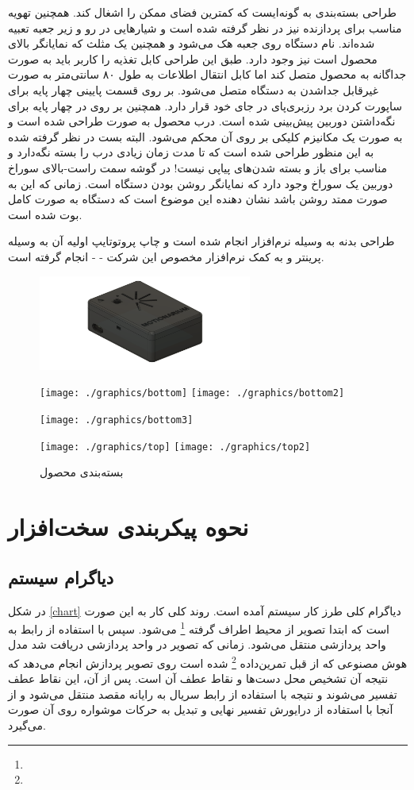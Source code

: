 \documentclass{article}
\begin{document}
طراحی بسته‌بندی به گونه‌ایست که کمترین‌ فضای ممکن را اشغال کند. همچنین تهویه مناسب برای پردازنده
نیز در نظر گرفته شده است و شیار‌هایی در رو و زیر جعبه تعبیه شده‌اند. 
نام دستگاه روی جعبه هک می‌شود و همچنین یک مثلث که نمایانگر بالای محصول است نیز وجود دارد. 
طبق این طراحی کابل تغذیه را کاربر باید به صورت جداگانه به محصول متصل کند اما کابل
انتقال اطلاعات به طول ۸۰ سانتی‌متر به صورت غیرقابل جدا‌شدن به دستگاه متصل می‌شود.
بر روی قسمت پایینی چهار پایه برای ساپورت‌ کردن برد رزبری‌پای در جای خود قرار دارد. همچنین
بر روی در چهار پایه برای نگه‌داشتن دوربین پیش‌بینی شده است.
درب محصول به صورت  طراحی شده است و به صورت یک مکانیزم کلیکی بر روی آن محکم می‌شود.
البته بست در نظر گرفته شده به این منظور طراحی شده است که تا مدت زمان زیادی درب را بسته نگه‌دارد
و مناسب برای باز و بسته شدن‌های پیاپی نیست! در گوشه سمت راست-بالای سوراخ دوربین یک سوراخ وجود دارد
که نمایانگر روشن بودن دستگاه است. زمانی که این  به صورت ممتد روشن باشد
نشان دهنده این موضوع است که دستگاه به صورت کامل بوت شده است.


طراحی بدنه به وسیله نرم‌افزار  انجام شده است و چاپ پروتوتایپ اولیه آن به وسیله پرینتر  و به کمک نرم‌افزار مخصوص این شرکت -  - انجام گرفته است.

\begin{figure}
	\centering
	
	\includegraphics[width=7cm]{./graphics/main}
	
	\texttt{[image: ./graphics/bottom]}
	\texttt{[image: ./graphics/bottom2]}
	
	\texttt{[image: ./graphics/bottom3]}
	
	\texttt{[image: ./graphics/top]}
	\texttt{[image: ./graphics/top2]}
	
	\caption{بسته‌بندی محصول}
	\label{case}
\end{figure}

\section{نحوه پیکر‌بندی سخت‌افزار}
\subsection{دیاگرام سیستم}
در شکل \ref{chart} دیاگرام کلی طرز کار سیستم‌ آمده است. روند کلی کار به این صورت است که
ابتدا تصویر از محیط اطراف گرفته \footnote{} می‌شود. سپس با استفاده از رابط  به واحد پردازشی منتقل می‌شود. زمانی که تصویر در واحد پردازشی دریافت شد مدل هوش
مصنوعی که از قبل تمرین‌داده \footnote{} شده است روی تصویر پردازش انجام می‌دهد که
نتیجه آن تشخیص محل دست‌ها و نقاط عطف آن است. پس از آن، این نقاط عطف تفسیر می‌شوند و نتیجه با
استفاده از رابط سریال به رایانه مقصد منتقل می‌شود و از آنجا با استفاده از درایورش  تفسیر
نهایی و تبدیل به حرکات موشواره روی آن صورت می‌گیرد.
\end{document}
